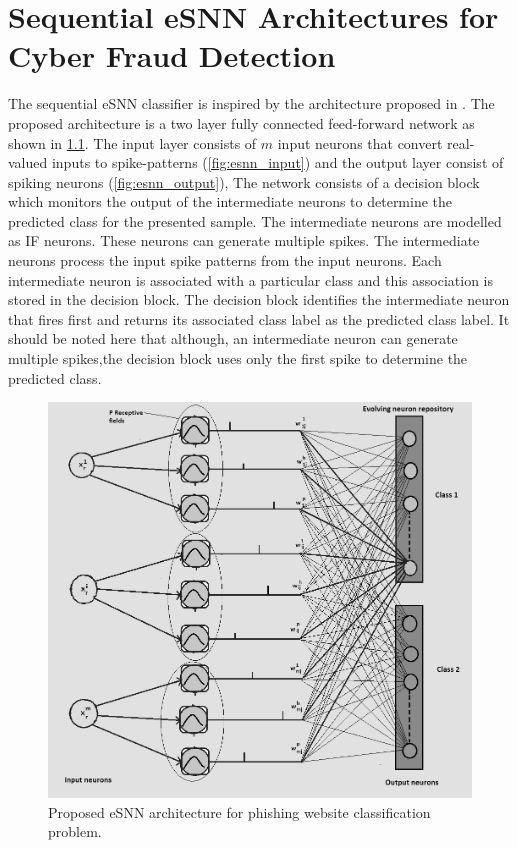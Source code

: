 
\chapter{Sequential eSNN Architectures for Cyber Fraud Detection}
\label{app:eSNN_cyber}

The sequential eSNN classifier is inspired by the architecture proposed in \citep{dora2015sequential}. The proposed architecture is a two layer fully connected feed-forward network as shown in \figurename \ref{fig:esnn}. The input layer consists of $m$ input neurons that convert real-valued inputs to spike-patterns (\figurename \ref{fig:esnn_input}) and the output layer consist of spiking neurons (\figurename \ref{fig:esnn_output}), The network consists of a decision block which monitors the output of the intermediate neurons to determine the predicted class for the presented sample. The intermediate neurons are modelled as IF neurons. These neurons can generate multiple spikes. The intermediate neurons process the input spike patterns from the input neurons. Each intermediate neuron is associated with a particular class and this association is stored in the decision block. The decision block identifies the intermediate neuron that fires first and returns its associated class label as the predicted class label. It should be noted here that although, an intermediate neuron can generate multiple spikes,the decision block uses only the first spike to determine the predicted class. 

\begin{figure}
	\centering
	\includegraphics[scale=0.3]{fig/snn/esnn.png}
	\caption{Proposed eSNN architecture for phishing website classification problem.}
	\label{fig:esnn}
\end{figure}

